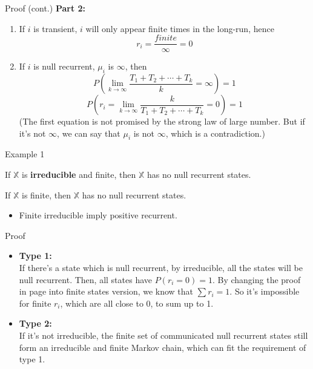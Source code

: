 \documentclass{beamer}
\begin{document}
\begin{frame}{Proof (cont.)}
	\textbf{Part 2:} \\
	\begin{enumerate}
	\item If $i$ is transient, $i$ will only appear finite times in the long-run, hence
		\[
		r_i = \frac{finite}{\infty} = 0
		\]
	\item If $i$ is null recurrent, $\mu_i$ is $\infty$, then
		\[
		P\left( \lim_{k\to\infty} \frac{T_1 + T_2 + \cdots + T_k}{k} = \infty \right) = 1
		\]
		\[
		P\left( r_i = \lim_{k\to\infty} \frac{k}{T_1 + T_2 + \cdots + T_k} = 0 \right) = 1
		\]
		(The first equation is not promised by the strong law of large number.
		But if it's not $\infty$, we can say that $\mu_i$ is not $\infty$, which is a contradiction.)
	\end{enumerate}
\end{frame}

\begin{frame}{Example 1}\label{finite_pos_rec}
	\begin{example}[type 1]
	If $\mathbb{X}$ is \textbf{irreducible} and finite, then $\mathbb{X}$ has no null recurrent states.
	\end{example}
	\begin{example}[type 2]
	If $\mathbb{X}$ is finite, then $\mathbb{X}$ has no null recurrent states.
	\end{example}
	\begin{itemize}
	\item Finite irreducible imply positive recurrent.
	\end{itemize}
\end{frame}

\begin{frame}{Proof}
	\begin{itemize}
	\item \textbf{Type 1:}\\
		If there's a state which is null recurrent, by irreducible, all the states will be null recurrent.
		Then, all states have $P(r_i = 0) = 1$.
		By changing the proof in page \pageref{proportion_sum} into finite states version, 
		we know that $\sum r_i = 1$.
		So it's impossible for finite $r_i$, which are all close to 0, to sum up to 1.
	\item \textbf{Type 2:}\\
		If it's not irreducible, the finite set of communicated null recurrent states still form an irreducible and finite Markov chain, which can fit the requirement of type 1.
	\end{itemize}
\end{frame}
\end{document}
